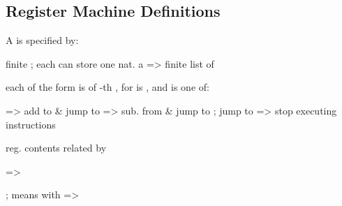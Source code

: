 \hSep

\subsection*{Register Machine Definitions}

A  is specified by:
\begin{itemize}
  \vItem finite  ; each can store one nat. 
  \vItem a  => finite list of 

  \begin{enumerate}
    \vItem each  of the form 
    \vItem {} is  of -th ,
    for 
    \vItem {} is , and is one of:

    \begin{enumerate}
      \vItem {} =>
      add  to   \& jump to  
      \vItem {} =>
        sub.  from  \& jump to ;
       jump to 
      \vItem {} => stop executing instructions
    \end{enumerate}
  \end{enumerate}

  \vItem {} reg. contents related by 
\end{itemize}

\hSep

 => 
\begin{enumerate}
  \vItem {}; 
  \vItem {} means
   with 
  \vItem {} => 
\end{enumerate}

\hSep

